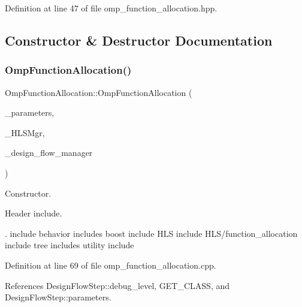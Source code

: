 Definition at line 47 of file omp\+\_\+function\+\_\+allocation.\+hpp.



\subsection{Constructor \& Destructor Documentation}
\mbox{\label{classOmpFunctionAllocation_a60fa31e3348e0886cac71f857066ed54}} 
\subsubsection{\texorpdfstring{Omp\+Function\+Allocation()}{OmpFunctionAllocation()}}
{\footnotesize\ttfamily Omp\+Function\+Allocation\+::\+Omp\+Function\+Allocation (\begin{DoxyParamCaption}\item[{const \hyperlink{Parameter_8hpp_a37841774a6fcb479b597fdf8955eb4ea}{Parameter\+Const\+Ref}}]{\+\_\+parameters,  }\item[{const \hyperlink{hls__manager_8hpp_acd3842b8589fe52c08fc0b2fcc813bfe}{H\+L\+S\+\_\+manager\+Ref}}]{\+\_\+\+H\+L\+S\+Mgr,  }\item[{const Design\+Flow\+Manager\+Const\+Ref}]{\+\_\+design\+\_\+flow\+\_\+manager }\end{DoxyParamCaption})}



Constructor. 

Header include.

. include behavior includes boost include H\+LS include H\+L\+S/function\+\_\+allocation include tree includes utility include 

Definition at line 69 of file omp\+\_\+function\+\_\+allocation.\+cpp.



References Design\+Flow\+Step\+::debug\+\_\+level, G\+E\+T\+\_\+\+C\+L\+A\+SS, and Design\+Flow\+Step\+::parameters.

\mbox{\label{classOmpFunctionAllocation_a215e7a25eba97e9c22999006a7446e7e}} 

